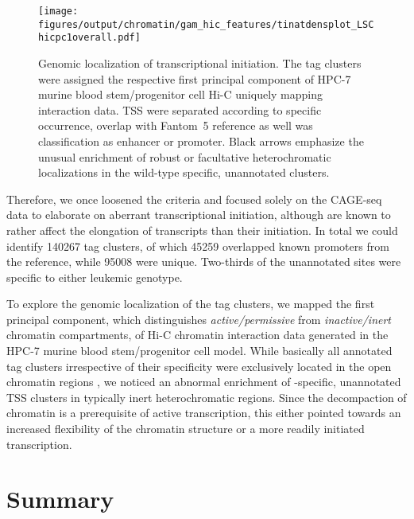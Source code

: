 \begin{figure}[!htb]
	\centering
	\texttt{[image: figures/output/chromatin/gam\_hic\_features/tinatdensplot\_LSChicpc1overall.pdf]} 
	\caption{Genomic localization of transcriptional initiation. The tag clusters were assigned the respective first principal component of HPC-7 murine blood stem/progenitor cell Hi-C uniquely mapping interaction data. TSS were separated according to specific occurrence, overlap with Fantom~5 reference as well was classification as enhancer or promoter. Black arrows emphasize the unusual enrichment of robust or facultative heterochromatic localizations in the wild-type specific, unannotated clusters.}
	\label{fig:tinatdensplot_LSChicpc1overall.pdf}
\end{figure} 

Therefore, we once loosened the criteria and focused solely on the CAGE-seq data to elaborate on aberrant transcriptional initiation, although \mllfp are known to rather affect the elongation of transcripts than their initiation\cite{Mohan2010}. In total we could identify \num{140267} tag clusters, of which \num{45259} overlapped known promoters from the  reference, while \num{95008} were unique. Two-thirds of the unannotated sites were specific to either leukemic genotype.

To explore the genomic localization of the tag clusters, we mapped the first principal component, which distinguishes \emph{active/permissive} from \emph{inactive/inert} chromatin compartments\cite{Lieberman-Aiden2009}, of Hi-C chromatin interaction data generated in the HPC-7 murine blood stem/progenitor cell model\cite{Wilson2016}. While basically all annotated tag clusters irrespective of their specificity were exclusively located in the open chromatin regions , we noticed an abnormal enrichment of \dnmtwt-specific, unannotated TSS clusters in typically inert heterochromatic regions. Since the decompaction of chromatin is a prerequisite of active transcription, this either pointed towards an increased flexibility of the chromatin structure or a more readily initiated transcription. 

\section{Summary}
\label{chap:r:tinats:degenesummary}

